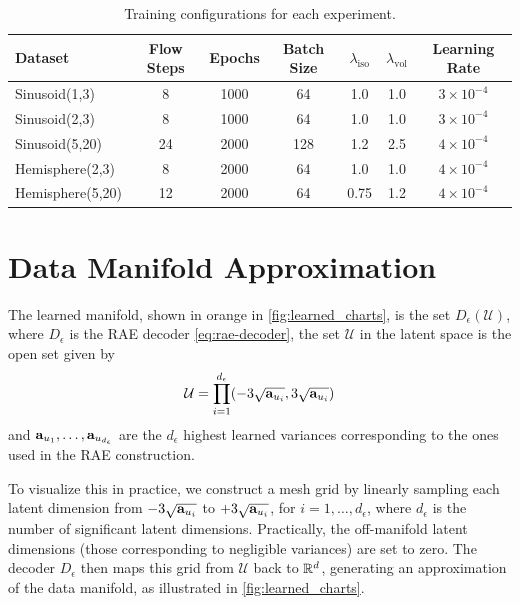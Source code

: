 \begin{table}[htbp]
    \centering
    \caption{Training configurations for each experiment.}
    \label{tab:training_details}
    \begin{tabular}{|l|c|c|c|c|c|c|}
        \hline
        \textbf{Dataset} & \textbf{Flow Steps} & \textbf{Epochs} & \textbf{Batch Size} & $\lambda_{\text{iso}}$ & $\lambda_{\text{vol}}$ & \textbf{Learning Rate} \\
        \hline
        Sinusoid(1,3)     & 8  & 1000  & 64  & 1.0  & 1.0  & $3 \times 10^{-4}$ \\
        Sinusoid(2,3)     & 8  & 1000  & 64  & 1.0  & 1.0  & $3 \times 10^{-4}$ \\
        Sinusoid(5,20)    & 24 & 2000  & 128 & 1.2  & 2.5  & $4 \times 10^{-4}$ \\
        Hemisphere(2,3)   & 8  & 2000  & 64  & 1.0  & 1.0  & $4 \times 10^{-4}$ \\
        Hemisphere(5,20)  & 12 & 2000  & 64  & 0.75 & 1.2  & $4 \times 10^{-4}$ \\
        \hline
    \end{tabular}
\end{table}

\section{Data Manifold Approximation}
\label{app:data_manifold_approximation}

The learned manifold, shown in orange in \ref{fig:learned_charts}, is the set \( D_{\epsilon}(\mathcal{U}) \), where \( D_{\epsilon} \) is the RAE decoder \ref{eq:rae-decoder}, the set \( \mathcal{U} \) in the latent space is the open set given by
\[
    \mathcal{U} = \prod_{i=1}^{d_{\epsilon}} (-3\sqrt{\mathbf{a}_{u_i}}, 3\sqrt{\mathbf{a}_{u_i}})
\]
and \( \mathbf{a}_{u_1}, \dots, \mathbf{a}_{u_{d_{\epsilon}}} \) are the \( d_{\epsilon} \) highest learned variances corresponding to the ones used in the RAE construction. 

To visualize this in practice, we construct a mesh grid by linearly sampling each latent dimension from \( -3\sqrt{\mathbf{a}_{u_i}} \) to \( +3\sqrt{\mathbf{a}_{u_i}} \), for \( i = 1, \dots, d_{\epsilon} \), where \( d_{\epsilon} \) is the number of significant latent dimensions. Practically, the off-manifold latent dimensions (those corresponding to negligible variances) are set to zero. The decoder \( D_{\epsilon} \) then maps this grid from \( \mathcal{U} \) back to \( \mathbb{R}^d \), generating an approximation of the data manifold, as illustrated in \ref{fig:learned_charts}.


